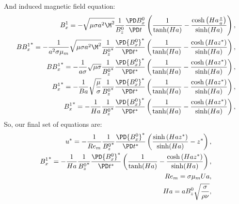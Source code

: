 \documentclass[11pt]{article}
\begin{document}
And induced magnetic field equation:
\begin{equation}\begin{aligned}
B_x^1 = - \sqrt{\mu \sigma a^2 \M^2} \frac{1}{B_z^0} \frac{\PD B_x^0}{\PD t} \left( \frac{1}{\tanh(Ha)} -  \frac{\cosh \left(Ha \frac{z}{a} \right)}{\sinh(Ha)}\right), \\
B {B_x^1}^* = - \frac{1}{a^2 \sigma \mu_m} \sqrt{\mu \sigma a^2 \M^2} \frac{1}{{B_z^0}^*} \frac{\PD {B_x^0}^*}{\PD t^*} \left( \frac{1}{\tanh(Ha)} -  \frac{\cosh \left(Ha z^* \right)}{\sinh(Ha)}\right), \\
B {B_x^1}^* = - \frac{1}{a \sigma} \sqrt{\mu \sigma} \frac{1}{{B_z^0}^*} \frac{\PD {B_x^0}^*}{\PD t^*} \left( \frac{1}{\tanh(Ha)} -  \frac{\cosh \left(Ha z^* \right)}{\sinh(Ha)}\right), \\
{B_x^1}^*   = - \frac{1}{B a} \sqrt{\frac{\mu}{\sigma}} \frac{1}{{B_z^0}^*} \frac{\PD {B_x^0}^*}{\PD t^*} \left( \frac{1}{\tanh(Ha)} -  \frac{\cosh \left(Ha z^* \right)}{\sinh(Ha)}\right), \\
{B_x^1}^*   = - \frac{1}{Ha} \frac{1}{{B_z^0}^*} \frac{\PD {B_x^0}^*}{\PD t^*} \left( \frac{1}{\tanh(Ha)} -  \frac{\cosh \left(Ha z^* \right)}{\sinh(Ha)}\right), \\
\end{aligned} \end{equation}
So, our final set of equations are:
\begin{equation}\begin{aligned}
u^*     = -  \frac{1}{Re_m} \frac{1}{{B_z^0}^*} \frac{\PD {B_x^0}^*}{\PD t^*} \left( \frac{\sinh\left(Ha z^* \right)}{\sinh(Ha)} - z^* \right), \\
{B_x^1}^* = - \frac{1}{Ha} \frac{1}{{B_z^0}^*} \frac{\PD {B_x^0}^*}{\PD t^*} \left( \frac{1}{\tanh(Ha)} -  \frac{\cosh \left(Ha z^* \right)}{\sinh(Ha)}\right), \\
Re_m = \sigma \mu_m U a, \\
Ha = a B_z^0 \sqrt{\frac{\sigma}{\rho \nu}}, \\
\end{aligned} \end{equation}
\end{document}
